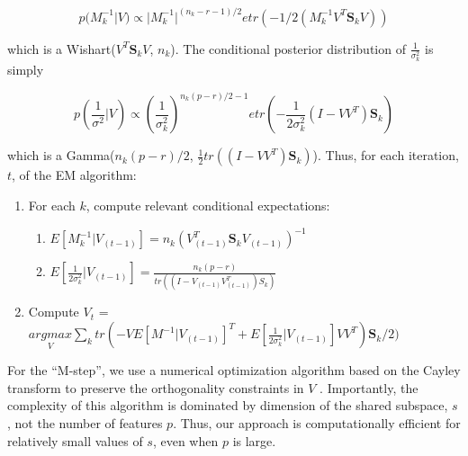 \documentclass{article}
\begin{document}
$$p(M_k^{-1} | V) \propto |M_k^{-1}|^{(n_k - r -1)/2}etr(-1/2(M_k^{-1}V^T\mathbf{S}_kV)) $$

\noindent which is a Wishart($V^T\mathbf{S}_kV$, $n_k$).  The
conditional posterior distribution of $\frac{1}{\sigma_k^2}$ is simply

$$p\left(\frac{1}{\sigma^2} | V\right) \propto \left(\frac{1}{\sigma_k^2}\right)^{n_k(p-r)/2-1}etr\left(-\frac{1}{2\sigma^2_k} (I-VV^T)\mathbf{S}_k\right)  $$

\noindent which is a Gamma($n_k(p-r)/2$,
$\frac{1}{2}tr((I-VV^T)\mathbf{S}_k)$).  Thus, for each iteration,
$t$, of the EM algorithm:

\begin{enumerate}
\item For each $k$, compute relevant conditional expectations:
\begin{enumerate}
\item $E[M_k^{-1} | V_{(t-1)}] = n_k(V_{(t-1)}^T \mathbf{S}_kV_{(t-1)})^{-1}$
\item $E[\frac{1}{2\sigma_k^2}|V_{(t-1)}] = \frac{n_k(p-r)}{tr((I-V_{(t-1)}V_{(t-1)}^T)S_k)}$
\end{enumerate}
\item Compute $V_{t}$ = $\underset{V}{argmax}  \sum_k tr\left(-VE[M^{-1}|V_{(t-1)}]^T +
       E[\frac{1}{2\sigma_k^2}|V_{(t-1)}]VV^T\right)\mathbf{S}_k/2)$ 
\end{enumerate}

For the ``M-step'', we use a numerical optimization algorithm based on
the Cayley transform to preserve the orthogonality constraints in $V$
\citep{Wen2013}.  Importantly, the complexity of this algorithm is
dominated by dimension of the shared subspace, $s$, not the number of
features $p$.  Thus, our approach is computationally efficient for
relatively small values of $s$, even when $p$ is large.



\end{document}
